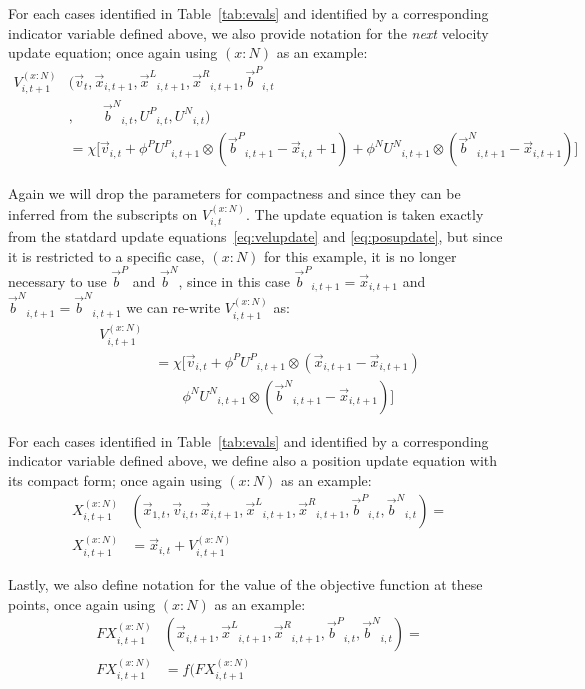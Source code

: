 \documentclass[journal,letterpaper]{IEEEtran}
\providecommand{\pers}{\ensuremath{P}}
\providecommand{\neigh}{\ensuremath{N}}
\providecommand{\leftind}{\ensuremath{L}}
\providecommand{\rightind}{\ensuremath{R}}
\providecommand{\nURand}{\ensuremath{U^\neigh}}
\providecommand{\pURand}{\ensuremath{U^\pers}}
\providecommand{\ppos}{\ensuremath{\Vec{x}}}
\providecommand{\pvel}{\ensuremath{\Vec{v}}}
\providecommand{\nbest}{\ensuremath{\Vec{b}^\neigh}}
\providecommand{\pbest}{\ensuremath{\Vec{b}^\pers}}
\providecommand{\constriction}{\ensuremath{\chi}}
\providecommand{\ncoeff}{\ensuremath{\phi^\neigh}}
\providecommand{\pcoeff}{\ensuremath{\phi^\pers}}
\providecommand{\ofunc}{\ensuremath{f}}
\providecommand{\specvel}{\ensuremath{V}}
\providecommand{\specpos}{\ensuremath{X}}
\providecommand{\specval}{\ensuremath{FX}}
\providecommand{\leftn}{\ensuremath{\Vec{x}^\leftind}}
\providecommand{\rightn}{\ensuremath{\Vec{x}^\rightind}}
\providecommand{\casexn}{\ensuremath{(x:\neigh)}}
\begin{document}
For each cases identified in Table~\ref{tab:evals} and identified by a
corresponding indicator variable defined above, we also provide notation for the \emph{next} velocity
update equation; once again using $\casexn$ as an example:
\begin{align}
\nonumber
	\specvel_{i,t+1}^{\casexn} & (\pvel_t, \ppos_{i,t+1}, \leftn_{i,t+1}, \rightn_{i,t+1}, \pbest_{i,t} \\
\nonumber
        &, \quad \quad \nbest_{i,t}, \pURand_{i,t}, \nURand_{i,t}) \\
\label{eq:defvocasexn}
		&= \constriction \bigl[ \pvel_{i,t} +
			\pcoeff\pURand_{i,t+1}\otimes(\pbest_{i,t+1} - \ppos_{i,t}+1) +
			\ncoeff\nURand_{i,t+1}\otimes(\nbest_{i,t+1} - \ppos_{i,t+1})
		\bigr]
\end{align}

Again we will drop the parameters for compactness and since
they can be inferred from the subscripts on $\specvel_{i,t}^{\casexn}$.
The update equation is taken exactly from the statdard update equations~\eqref{eq:velupdate}
and \eqref{eq:posupdate}, but
since it is restricted to a specific case, $\casexn$ for this example,
it is no longer necessary to use $\pbest$ and $\nbest$, since in this case
$\pbest_{i,t+1}=\ppos_{i,t+1}$ and $\nbest_{i,t+1}=\nbest_{i,t+1}$ we can re-write
$\specvel_{i,t+1}^{\casexn}$ as:
\begin{align}
\nonumber
	\specvel_{i,t+1}^{\casexn} & \\
\label{eq:defvcasexn}
		&= \constriction \bigl[ \pvel_{i,t} +
			\pcoeff\pURand_{i,t+1}\otimes(\ppos_{i,t+1} - \ppos_{i,t+1}) \\
			& \quad \quad \ncoeff\nURand_{i,t+1}\otimes(\nbest_{i,t+1} - \ppos_{i,t+1})
		\bigr]
\end{align}

For each cases identified in
Table~\ref{tab:evals}
and identified by a corresponding indicator variable defined above,
we define also a position update equation with its compact form; once again using $\casexn$ as an example:
\begin{align}
\label{eq:defpcasexn}
	\specpos_{i,t+1}^{\casexn} & (\ppos_{1,t}, \pvel_{i,t},\ppos_{i,t+1} ,\leftn_{i,t+1},\rightn_{i,t+1} ,\pbest_{i,t} ,\nbest_{i,t})= \\
\nonumber
	\specpos_{i,t+1}^{\casexn} & =  \ppos_{i,t} + \specvel_{i,t+1}^{\casexn}
\end{align}

Lastly, we also define notation for the value of the objective function at these points,
once again using $\casexn$ as an example:
\begin{align}
\label{eq:deffcasexn}
	\specval_{i,t+1}^{\casexn} & (\ppos_{i,t+1} ,\leftn_{i,t+1},\rightn_{i,t+1} ,\pbest_{i,t} ,\nbest_{i,t})= \\
\nonumber
	\specval_{i,t+1}^{\casexn} & =  \ofunc(\specval_{i,t+1}^{\casexn}
\end{align}
\end{document}
